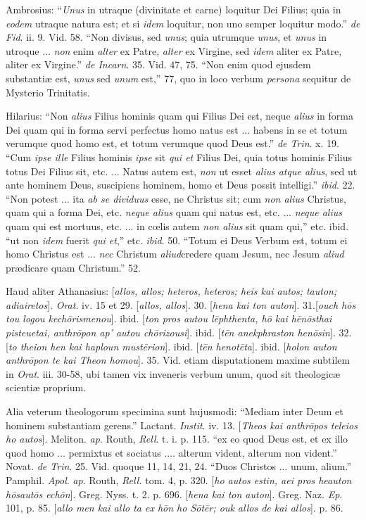 Ambrosius: ``\emph{Unus} in utraque (divinitate et
carne) loquitur Dei Filius; quia in \emph{eodem} utraque natura est;
et si \emph{idem} loquitur, non uno semper loquitur modo.'' \emph{de Fid}.
ii. 9. Vid. 58. ``Non divisus, sed \emph{unus}; quia utrumque \emph{unus},
et \emph{unus} in utroque ... \emph{non} enim \emph{alter} ex Patre, \emph{alter}
ex Virgine, sed \emph{idem} aliter ex Patre, aliter ex Virgine.'' \emph{de
Incarn}. 35. Vid. 47, 75. ``Non enim quod ejusdem substantiæ est, \emph{unus}
sed \emph{unum} est,'' 77, quo in loco verbum \emph{persona} sequitur
de Mysterio Trinitatis.

Hilarius: ``Non \emph{alius} Filius hominis quam
qui Filius Dei est, neque \emph{alius} in forma Dei quam qui in forma
servi perfectus homo natus est ... habens in se et totum verumque quod
homo est, et totum verumque quod Deus est.'' \emph{de Trin}. x. 19. ``Cum
\emph{ipse ille} Filius hominis \emph{ipse} sit \emph{qui et} Filius
Dei, quia totus hominis Filius totus Dei Filius sit, etc. ... Natus
autem est, \emph{non} ut esset \emph{alius} \emph{atque alius}, sed ut
ante hominem Deus, suscipiens hominem, homo et Deus possit intelligi.''
\emph{ibid}. 22. ``Non potest ... ita \emph{ab se dividuus} esse, ne
Christus sit; cum \emph{non alius} Christus, quam qui a forma Dei,
etc. \emph{neque alius} quam qui natus est, etc. ... \emph{neque alius}
quam qui est mortuus, etc. ... in cœlis autem \emph{non alius} sit
quam qui,'' etc. ibid. ``ut non \emph{idem} fuerit \emph{qui et},'' etc. \emph{ibid}.
50. ``Totum ei Deus Verbum est, totum ei homo Christus est ... \emph{nec}
Christum \emph{aliud}credere quam Jesum, nec Jesum \emph{aliud} prædicare
quam Christum.'' 52.

Haud aliter Athanasius: [\emph{allos, allos; heteros,
heteros; heis kai autos; tauton; adiairetos}]. \emph{Orat}. iv. 15
et 29. [\emph{allos, allos}]. 30. [\emph{hena kai ton auton}].
31.[\emph{ouch h\={o}s tou logou kech\={o}rismenou}]. ibid. [\emph{ton
pros autou l\={e}phthenta, h\={o} kai h\={e}n\={o}sthai
pisteuetai, anthr\={o}pon ap' autou ch\={o}rizousi}]. ibid. [\emph{t\={e}n
anekphraston hen\={o}sin}]. 32. [\emph{to theion hen kai haploun
must\={e}rion}]. ibid. [\emph{t\={e}n henot\={e}ta}].
ibid. [\emph{holon auton anthr\={o}pon te kai Theon homou}]. 35.
Vid. etiam disputationem maxime subtilem in \emph{Orat}. iii. 30-58,
ubi tamen vix inveneris verbum unum, quod sit theologicæ scientiæ
proprium.

Alia veterum theologorum specimina sunt hujusmodi:
``Mediam inter Deum et hominem substantiam gerens.'' Lactant. \emph{Instit}.
iv. 13. [\emph{Theos kai anthr\={o}pos teleios ho autos}]. Meliton.
\emph{ap}. Routh, \emph{Rell}. t. i. p. 115. ``ex eo quod Deus est, et
ex illo quod homo ... permixtus et sociatus .... alterum vident,
alterum non vident.'' Novat. \emph{de Trin}. 25. Vid. quoque 11, 14,
21, 24. ``Duos Christos ... unum, alium.'' Pamphil. \emph{Apol}. \emph{ap}.
Routh, \emph{Rell.} tom. 4, p. 320. [\emph{ho autos estin, aei pros
heauton h\={o}saut\={o}s ech\={o}n}]. Greg. Nyss. t. 2. p.
696. [\emph{hena kai ton auton}]. Greg. Naz. \emph{Ep}. 101, p. 85. [\emph{allo
men kai allo ta ex h\={o}n ho S\={o}t\={e}r; ouk allos de kai
allos}]. p. 86.

